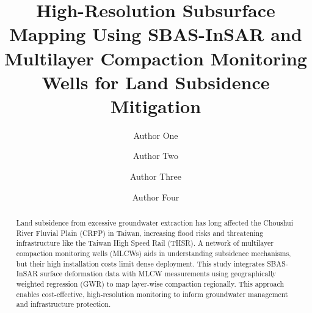 \documentclass[a4paper,fleqn]{cas-dc}
\begin{document}
	\let\WriteBookmarks\relax
	\def\floatpagepagefraction{1}
	\def\textpagefraction{.001}
	
	
	
	\title [mode = title]{High-Resolution Subsurface Mapping Using SBAS-InSAR and Multilayer Compaction Monitoring Wells for Land Subsidence Mitigation}  
	
	\author[1]{Author One}
	\cormark[1] %
	
	\author[1]{Author Two}
	
	\author[2]{Author Three}
	
	\author[3]{Author Four}
	
	
	\begin{abstract}
		Land subsidence from excessive groundwater extraction has long affected the Choushui River Fluvial Plain (CRFP) in Taiwan, increasing flood risks and threatening infrastructure like the Taiwan High Speed Rail (THSR). A network of multilayer compaction monitoring wells (MLCWs) aids in understanding subsidence mechanisms, but their high installation costs limit dense deployment. This study integrates SBAS-InSAR surface deformation data with MLCW measurements using geographically weighted regression (GWR) to map layer-wise compaction regionally. This approach enables cost-effective, high-resolution monitoring to inform groundwater management and infrastructure protection.
	\end{abstract}
	
	
\end{document}
